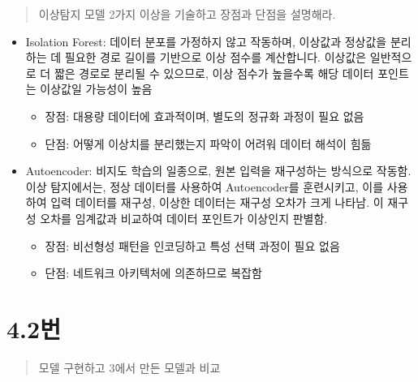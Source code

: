 \documentclass[
  letterpaper,
  DIV=11,
  numbers=noendperiod]{scrreprt}
\providecommand{\tightlist}{%
  \setlength{\itemsep}{0pt}\setlength{\parskip}{0pt}}\usepackage{longtable,booktabs,array}
\begin{document}

\begin{quote}
이상탐지 모델 2가지 이상을 기술하고 장점과 단점을 설명해라.
\end{quote}

\begin{itemize}
\tightlist
\item
  Isolation Forest: 데이터 분포를 가정하지 않고 작동하며, 이상값과
  정상값을 분리하는 데 필요한 경로 길이를 기반으로 이상 점수를
  계산합니다. 이상값은 일반적으로 더 짧은 경로로 분리될 수 있으므로,
  이상 점수가 높을수록 해당 데이터 포인트는 이상값일 가능성이 높음

  \begin{itemize}
  \tightlist
  \item
    장점: 대용량 데이터에 효과적이며, 별도의 정규화 과정이 필요 없음
  \item
    단점: 어떻게 이상치를 분리했는지 파악이 어려워 데이터 해석이 힘듦
  \end{itemize}
\item
  Autoencoder: 비지도 학습의 일종으로, 원본 입력을 재구성하는 방식으로
  작동함. 이상 탐지에서는, 정상 데이터를 사용하여 Autoencoder를
  훈련시키고, 이를 사용하여 입력 데이터를 재구성, 이상한 데이터는 재구성
  오차가 크게 나타남. 이 재구성 오차를 임계값과 비교하여 데이터 포인트가
  이상인지 판별함.

  \begin{itemize}
  \tightlist
  \item
    장점: 비선형성 패턴을 인코딩하고 특성 선택 과정이 필요 없음
  \item
    단점: 네트워크 아키텍처에 의존하므로 복잡함
  \end{itemize}
\end{itemize}

\hypertarget{uxbc88-11}{%
\section*{4.2번}\label{uxbc88-11}}


\begin{quote}
모델 구현하고 3에서 만든 모델과 비교
\end{quote}
\end{document}
